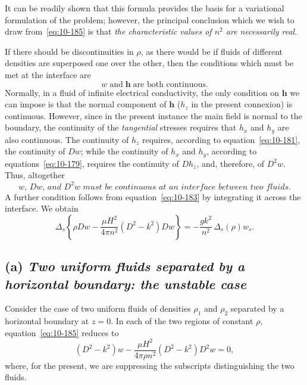 It can be readily shown that this formula provides the basis for a variational formulation of the problem; however, the principal conclusion which we wish to draw from~\eqref{eq:10-185} is that \emph{the characteristic values of $n^2$ are necessarily real}.

If there should be discontinuities in $\rho$, as there would be if fluids of different densities are superposed one over the other, then the conditions which must be met at the interface are
\begin{equation}
\label{eq:10-186}
w\;\text{and}\;\mathbf{h}\;\text{are both continuous.}
\end{equation}
Normally, in a fluid of infinite electrical conductivity, the only condition on $\mathbf{h}$ we can impose is that the normal component of $\mathbf{h}$ ($h_z$ in the present connexion) is continuous. However, since in the present instance the main field is normal to the boundary, the continuity of the \emph{tangential} stresses requires that $h_x$ and $h_y$ are also continuous. The continuity of $h_z$ requires, according to equation~\eqref{eq:10-181}, the continuity of $Dw$; while the continuity of $h_x$ and $h_y$, according to equations~\eqref{eq:10-179}, requires the continuity of $Dh_z$, and, therefore, of $D^2w$. Thus, altogether
\begin{equation}
\label{eq:10-187}
\textit{$w$, $Dw$, and $D^2w$ must be continuous at an interface between two fluids.}
\end{equation}
A further condition follows from equation~\eqref{eq:10-183} by integrating it across the interface. We obtain
\begin{equation}
\label{eq:10-188}
\Delta_s\!\left\{\rho Dw - \frac{\mu H^2}{4\pi n^2}(D^2-k^2)Dw\right\} = -\frac{gk^2}{n^2}\,\Delta_s(\rho)w_s.
\end{equation}

\subsection*{(a) \textit{Two uniform fluids separated by a horizontal boundary: the unstable case}}

Consider the case of two uniform fluids of densities $\rho_1$ and $\rho_2$ separated by a horizontal boundary at $z = 0$. In each of the two regions of constant $\rho$, equation~\eqref{eq:10-185} reduces to
\begin{equation}
\label{eq:10-189}
(D^2-k^2)w - \frac{\mu H^2}{4\pi\rho n^2}(D^2-k^2)D^2w = 0,
\end{equation}
where, for the present, we are suppressing the subscripts distinguishing the two fluids.

